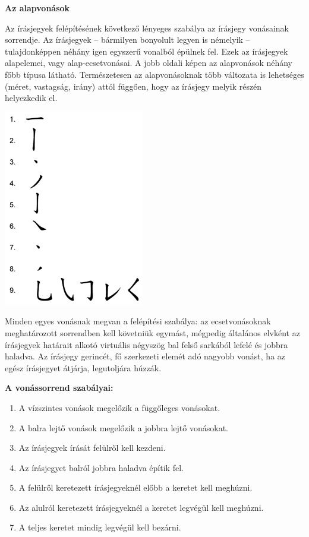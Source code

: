 
{\large \textbf{Az alapvonások}}

Az írásjegyek felépítésének következő lényeges szabálya az írásjegy vonásainak sorrendje. Az írásjegyek – bármilyen bonyolult legyen is némelyik – tulajdonképpen néhány igen egyszerű vonalból épülnek fel. Ezek az írásjegyek alapelemei, vagy alap-ecsetvonásai. A jobb oldali képen az alapvonások néhány főbb típusa látható. Természetesen az alapvonásoknak több változata is lehetséges (méret, vastagság, irány) attól függően, hogy az írásjegy melyik részén helyezkedik el.

\begin{center}
	\includegraphics[width=0.4\linewidth]{images/chinese_strokes.png}
\end{center}



Minden egyes vonásnak megvan a felépítési szabálya: az ecsetvonásoknak meghatározott sorrendben kell követniük egymást, mégpedig általános elvként az írásjegyek határait alkotó virtuális négyszög bal felső sarkából lefelé és jobbra haladva. Az írásjegy gerincét, fő szerkezeti elemét adó nagyobb vonást, ha az egész írásjegyet átjárja, legutoljára húzzák.

\newpage
{\large \textbf{A vonássorrend szabályai: }}
\begin{enumerate}
	\item A vízszintes vonások megelőzik a függőleges vonásokat.
	\item A balra lejtő vonások megelőzik a jobbra lejtő vonásokat. 
	\item Az írásjegyek írását felülről kell kezdeni. 
	\item Az írásjegyet balról jobbra haladva építik fel. 
	\item A felülről keretezett írásjegyeknél előbb a keretet kell meghúzni. 
	\item Az alulról keretezett írásjegyeknél a keretet legvégül kell meghúzni. 
	\item A teljes keretet mindig legvégül kell bezárni.
\end{enumerate}

